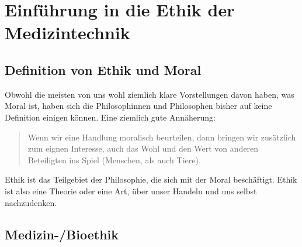\chapter{Einführung in die Ethik der Medizintechnik}

\section{Definition von Ethik und Moral}

Obwohl die meisten von uns wohl ziemlich klare Vorstellungen davon haben, was Moral ist, haben sich die
Philosophinnen und Philosophen bisher auf keine Definition einigen können. Eine ziemlich gute Annäherung:
\begin{quote}
	Wenn wir eine Handlung moralisch beurteilen, dann bringen wir zusätzlich zum eignen Interesse, auch das Wohl und den Wert von anderen Beteiligten ins Spiel (Menschen, als auch Tiere).
\end{quote}
Ethik ist das Teilgebiet der Philosophie, die sich mit der Moral beschäftigt. Ethik ist also eine Theorie oder eine Art, über unser Handeln und uns selbst nachzudenken.

\section{Medizin-/Bioethik}

